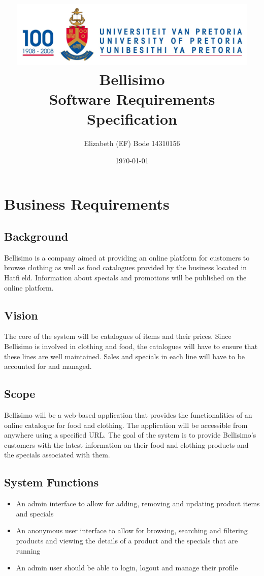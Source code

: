 \documentclass[a4paper,10pt]{article}
\title{\includegraphics[width=12cm]{Eeufeeslogo.jpg} \\       
      \bfseries Bellisimo \\
       \vspace{1.0cm}
       Software Requirements Specification \\ 
       \vspace{0.5cm}
       }
\date{\today}
\author{Elizabeth (EF) Bode			14310156}
\begin{document}
\maketitle
\thispagestyle{empty}

\newpage
{}
\thispagestyle{empty}
\tableofcontents
\clearpage

\newpage
{}

\section{Business Requirements}
\subsection{Background}
Bellisimo is a company aimed at providing an online platform for customers to browse clothing as well as food catalogues provided by the business located in Hatfield. Information about specials and promotions will be published on the online platform.

\subsection{Vision}
The core of the system will be catalogues of items and their prices. Since Bellisimo is involved in clothing and food, the catalogues will have to ensure that these lines are well maintained. Sales and specials in each line will have to be accounted for and managed.

\subsection{Scope}
Bellisimo will be a web-based application that provides the functionalities of an online catalogue for food and clothing. The application will be accessible from anywhere using a specified URL. The goal of the system is to provide Bellisimo’s customers with the latest information on their food and clothing products and the specials associated with them.

\subsection{System Functions}
\begin{itemize}
	\item An admin interface to allow for adding, removing and updating product items and specials
	\item An anonymous user interface to allow for browsing, searching and filtering products and viewing the details of a product and the specials that are running
	\item An admin user should be able to login, logout and manage their profile
\end{itemize}
\end{document}
